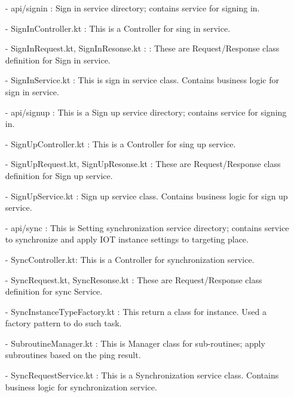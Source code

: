 \documentclass[conference]{IEEEtran}
\begin{document}
\begin{enumerate}
        \item [-] api/signin : Sign in service directory; contains service for signing in.\\
        \item [-] SignInController.kt : This is a Controller for sing in service.\\
        \item [-] SignInRequest.kt, SignInResonse.kt : : These are Request/Response class definition for Sign in service.\\
        \item [-] SignInService.kt : This is sign in service class. Contains business logic for sign in service.
        \item [-] api/signup : This is a Sign up service directory; contains service for signing in.\\
        \item [-] SignUpController.kt : This is a Controller for sing up service.\\
        \item [-] SignUpRequest.kt, SignUpResonse.kt : These are Request/Response class definition for Sign up service.\\
        \item [-] SignUpService.kt : Sign up service class. Contains business logic for sign up service.\\
        \item [-] api/sync : This is Setting synchronization service directory; contains service to synchronize and apply IOT
instance settings to targeting place.\\
        \item [-] SyncController.kt: This is a  Controller for synchronization service.\\
        \item [-] SyncRequest.kt, SyncResonse.kt : These are Request/Response class definition for sync Service.\\
        \item [-] SyncInstanceTypeFactory.kt : This return a class for instance. Used a factory pattern to do such task.\\
        \item [-] SubroutineManager.kt : This is Manager class for sub-routines; apply subroutines based on the ping result.\\
        \item [-] SyncRequestService.kt : This is a Synchronization service class. Contains business logic for synchronization service.\\

\end{enumerate}
\end{document}
